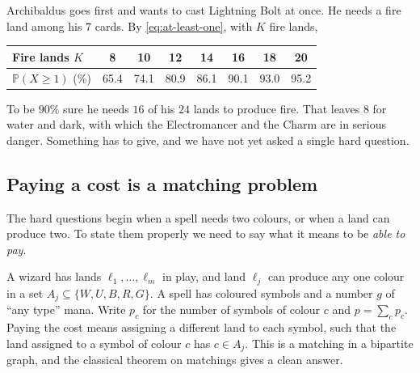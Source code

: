 \documentclass[
    a4paper,
    DIV=13,
    abstract=true,
    numbers=noenddot
]{scrartcl}
\begin{document}
\begin{example}\label{ex:bolt}
Archibaldus goes first and wants to cast Lightning Bolt at once. He needs a fire land among his $7$ cards. By \eqref{eq:at-least-one}, with $K$ fire lands,
\begin{center}
\begin{tabular}{lccccccc}
\toprule
Fire lands $K$ & 8 & 10 & 12 & 14 & 16 & 18 & 20\\
\midrule
$\mathbb{P}(X\ge1)$ (\%) & 65.4 & 74.1 & 80.9 & 86.1 & 90.1 & 93.0 & 95.2\\
\bottomrule
\end{tabular}
\end{center}
To be $90\%$ sure he needs $16$ of his $24$ lands to produce fire. That leaves $8$ for water and dark, with which the Electromancer and the Charm are in serious danger. Something has to give, and we have not yet asked a single hard question.
\end{example}

\subsection{Paying a cost is a matching problem}
The hard questions begin when a spell needs two colours, or when a land can produce two. To state them properly we need to say what it means to be \emph{able to pay}.

A wizard has lands $\ell_1,\dots,\ell_m$ in play, and land $\ell_j$ can produce any one colour in a set $A_j\subseteq\{W,U,B,R,G\}$. A spell has coloured symbols and a number $g$ of ``any type'' mana. Write $p_c$ for the number of symbols of colour $c$ and $p=\sum_c p_c$. Paying the cost means assigning a different land to each symbol, such that the land assigned to a symbol of colour $c$ has $c\in A_j$. This is a matching in a bipartite graph, and the classical theorem on matchings gives a clean answer.
\end{document}
